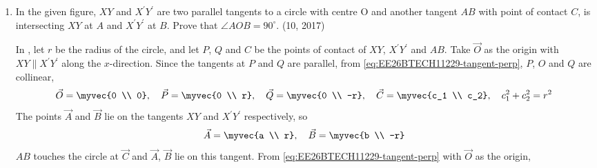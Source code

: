 \begin{enumerate}[label=\thesubsection.\arabic*, ref=\thesubsection.\theenumi]
\item 
In the given figure, $XY$ and $X^{\prime}Y^{\prime}$ are two parallel tangents to a circle with centre O and another tangent $AB$ with point of contact $C$, is intersecting $XY$ at $A$ and $X^{\prime}Y^{\prime}$ at $B$. Prove that $\angle AOB = 90^{\circ}$.
\hfill (10, 2017)
\begin{figure}[H]
	\centering
{}
\caption{}
    \label{fig:EE26BTECH11229-3}
\end{figure}
\solution
In , let $r$ be the radius of the circle, and let $P$, $Q$ and $C$ be the points of contact of $XY$, $X^{\prime}Y^{\prime}$ and $AB$. Take $\vec{O}$ as the origin with $XY \parallel X^{\prime}Y^{\prime}$ along the $x$-direction. Since the tangents at $P$ and $Q$ are parallel, from \eqref{eq:EE26BTECH11229-tangent-perp}, $P$, $O$ and $Q$ are collinear,
\begin{align}
	\vec{O} = \myvec{0 \\ 0}, \quad \vec{P} = \myvec{0 \\ r}, \quad \vec{Q} = \myvec{0 \\ -r}, \quad \vec{C} = \myvec{c_1 \\ c_2}, \quad c_1^2 + c_2^2 = r^2
\end{align}
The points $\vec{A}$ and $\vec{B}$ lie on the tangents $XY$ and $X^{\prime}Y^{\prime}$ respectively, so
\begin{align}
	\vec{A} = \myvec{a \\ r}, \quad \vec{B} = \myvec{b \\ -r}
\end{align}
$AB$ touches the circle at $\vec{C}$ and $\vec{A}$, $\vec{B}$ lie on this tangent. From \eqref{eq:EE26BTECH11229-tangent-perp} with $\vec{O}$ as the origin,

\end{enumerate}
